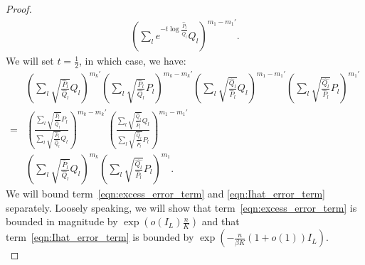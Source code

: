 \documentclass{article}
\begin{document}
\begin{proof}
\begin{align*}
     \left( \sum_l e^{-t \log \frac{\hat{P}_l}{\hat{Q}_l}} Q_l \right)^{m_1 - m_1'}.
\end{align*}
We will set $t = \frac{1}{2}$, in which case, we have:
\begin{align}
& \left( \sum_l \sqrt{\frac{\hat{P}_l}{\hat{Q}_l} } Q_l \right)^{m_k'}
 \left( \sum_l \sqrt{\frac{\hat{P}_l}{\hat{Q}_l} } P_l \right)^{m_k - m_k'}
 \left( \sum_l \sqrt{\frac{\hat{Q}_l}{\hat{P}_l} } Q_l \right)^{m_1 - m_1'}
       \left( \sum_l \sqrt{\frac{\hat{Q_l}}{\hat{P}_l} } P_l \right)^{m_1'} \nonumber \\
=&  \left( \frac{\sum_l \sqrt{\frac{\hat{P}_l}{\hat{Q}_l} } P_l}
                {\sum_l \sqrt{\frac{\hat{P}_l}{\hat{Q}_l} } Q_l}  \right)^{m_k - m_k'}
 \left( \frac{ \sum_l \sqrt{\frac{\hat{Q}_l}{\hat{P}_l} } Q_l}
             { \sum_l \sqrt{\frac{\hat{Q}_l}{\hat{P}_l} } P_l} \right)^{m_1 - m_1'}  
   \label{eqn:excess_error_term} \\
 & \left( \sum_l \sqrt{ \frac{\hat{P}_l}{\hat{Q}_l}} Q_l \right)^{m_k} 
    \left( \sum_l \sqrt{\frac{\hat{Q_l}}{\hat{P}_l} } P_l \right)^{m_1}.
   \label{eqn:Ihat_error_term} 
\end{align} 
We will bound term~\ref{eqn:excess_error_term} and \ref{eqn:Ihat_error_term} separately. Loosely speaking, we will show that term~\ref{eqn:excess_error_term} is bounded in magnitude by $\exp( o(I_L) \frac{n}{K} )$ and that term~\ref{eqn:Ihat_error_term} is bounded by $\exp( - \frac{n}{\beta K} (1 + o(1) )I_L)$.\\ 


\end{proof}
\end{document}
